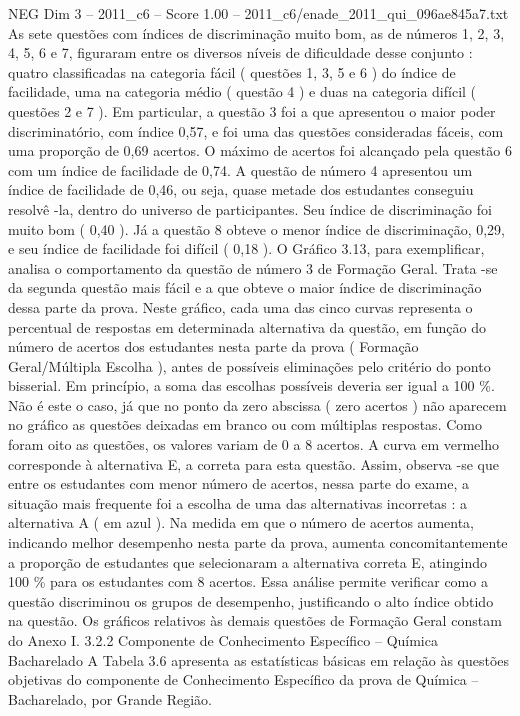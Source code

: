 \begin{textsample}{NEG Dim 3 – 2011\_c6 – Score 1.00 – 2011\_c6/enade\_2011\_qui\_096ae845a7.txt}
As sete questões com índices de discriminação muito bom, as de números 1, 2, 3, 4, 5, 6 e 7, figuraram entre os diversos níveis de dificuldade desse conjunto : quatro classificadas na categoria fácil ( questões 1, 3, 5 e 6 ) do índice de facilidade, uma na categoria médio ( questão 4 ) e duas na categoria difícil ( questões 2 e 7 ).
Em particular, a questão 3 foi a que apresentou o maior poder discriminatório, com índice 0,57, e foi uma das questões consideradas fáceis, com uma proporção de 0,69 acertos.
O máximo de acertos foi alcançado pela questão 6 com um índice de facilidade de 0,74.
A questão de número 4 apresentou um índice de facilidade de 0,46, ou seja, quase metade dos estudantes conseguiu resolvê -la, dentro do universo de participantes.
Seu índice de discriminação foi muito bom ( 0,40 ).
Já a questão 8 obteve o menor índice de discriminação, 0,29, e seu índice de facilidade foi difícil ( 0,18 ).
O Gráfico 3.13, para exemplificar, analisa o comportamento da questão de número 3 de Formação Geral.
Trata -se da segunda questão mais fácil e a que obteve o maior índice de discriminação dessa parte da prova.
Neste gráfico, cada uma das cinco curvas representa o percentual de respostas em determinada alternativa da questão, em função do número de acertos dos estudantes nesta parte da prova ( Formação Geral/Múltipla Escolha ), antes de possíveis eliminações pelo critério do ponto bisserial.
Em princípio, a soma das escolhas possíveis deveria ser igual a 100 \%.
Não é este o caso, já que no ponto da zero abscissa ( zero acertos ) não aparecem no gráfico as questões deixadas em branco ou com múltiplas respostas.
Como foram oito as questões, os valores variam de 0 a 8 acertos.
A curva em vermelho corresponde à alternativa E, a correta para esta questão.
Assim, observa -se que entre os estudantes com menor número de acertos, nessa parte do exame, a situação mais frequente foi a escolha de uma das alternativas incorretas : a alternativa A ( em azul ).
Na medida em que o número de acertos aumenta, indicando melhor desempenho nesta parte da prova, aumenta concomitantemente a proporção de estudantes que selecionaram a alternativa correta E, atingindo 100 \% para os estudantes com 8 acertos.
Essa análise permite verificar como a questão discriminou os grupos de desempenho, justificando o alto índice obtido na questão.
Os gráficos relativos às demais questões de Formação Geral constam do Anexo I. 3.2.2 Componente de Conhecimento Específico – Química Bacharelado A Tabela 3.6 apresenta as estatísticas básicas em relação às questões objetivas do componente de Conhecimento Específico da prova de Química – Bacharelado, por Grande Região.

\end{textsample}
